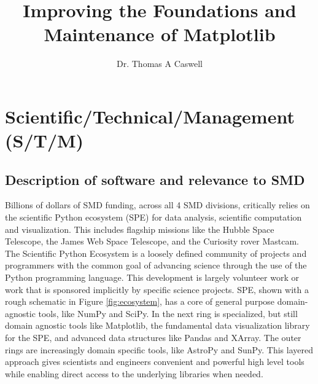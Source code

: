 \documentclass[12pt]{article}
\numberwithin{page}{section}
\begin{document}
\title{Improving the Foundations and Maintenance of Matplotlib}
\author{Dr. Thomas A Caswell}
\date{}
\maketitle

\setcounter{tocdepth}{2}
\tableofcontents
\thispagestyle{empty}
\newpage

\section{Scientific/Technical/Management (S/T/M)}
\setcounter{page}{1}

\subsection{Description of software and relevance to SMD}

Billions of dollars of SMD funding, across all 4 SMD divisions,
critically relies on the scientific Python ecosystem (SPE) for data
analysis, scientific computation and visualization.  This includes
flagship missions like the Hubble Space Telescope, the James Web Space
Telescope, and the Curiosity rover
Mastcam\cite{https://doi.org/10.1002/2016EA000219}.  The Scientific
Python Ecosystem is a loosely defined community of projects and
programmers with the common goal of advancing science through the use
of the Python programming language.  This development is largely
volunteer work or work that is sponsored implicitly by specific
science projects.  SPE, shown with a rough schematic in Figure
\ref{fig:ecosystem}, has a core of general purpose domain-agnostic
tools, like NumPy\cite{Harris2020} and SciPy\cite{Virtanen2020}. In
the next ring is specialized, but still domain agnostic tools like
Matplotlib\cite{Hunter:2007}, the fundamental data visualization
library for the SPE, and advanced data structures like Pandas and
XArray.  The outer rings are increasingly domain specific tools, like
AstroPy\cite{robitaille2013astropy} and
SunPy\cite{sunpy_community2020}.  This layered approach gives
scientists and engineers convenient and powerful high level tools
while enabling direct access to the underlying libraries when needed.
\end{document}
